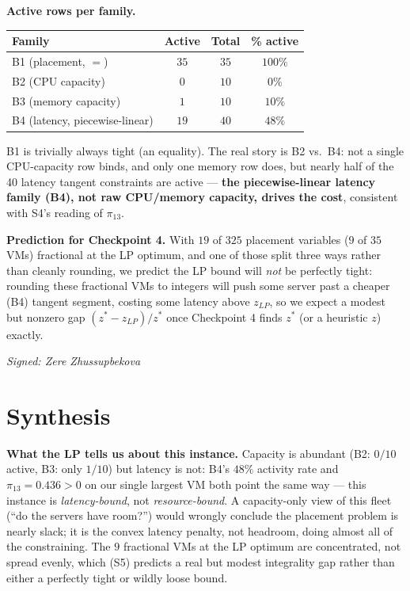 \documentclass[11pt]{article}
\begin{document}
\textbf{Active rows per family.}
\begin{center}
\renewcommand{\arraystretch}{1.2}
\begin{tabular}{@{}lccc@{}}
\toprule
Family & Active & Total & \% active \\
\midrule
B1 (placement, $=$) & $35$ & $35$ & $100\%$ \\
B2 (CPU capacity) & $0$ & $10$ & $0\%$ \\
B3 (memory capacity) & $1$ & $10$ & $10\%$ \\
B4 (latency, piecewise-linear) & $19$ & $40$ & $48\%$ \\
\bottomrule
\end{tabular}
\end{center}
B1 is trivially always tight (an equality). The real story is B2 vs.\ B4: not a single CPU-capacity
row binds, and only one memory row does, but nearly half of the 40 latency tangent constraints are
active --- \textbf{the piecewise-linear latency family (B4), not raw CPU/memory capacity, drives
the cost}, consistent with S4's reading of $\pi_{13}$.

\textbf{Prediction for Checkpoint 4.} With $19$ of $325$ placement variables ($9$ of $35$ VMs)
fractional at the LP optimum, and one of those split three ways rather than cleanly rounding, we
predict the LP bound will \emph{not} be perfectly tight: rounding these fractional VMs to integers
will push some server past a cheaper (B4) tangent segment, costing some latency above $z_{LP}$, so
we expect a modest but nonzero gap $(z^\ast-z_{LP})/z^\ast$ once Checkpoint 4 finds $z^\ast$ (or a
heuristic $z$) exactly.

\vspace{4pt}\noindent\textit{Signed: Zere Zhussupbekova}

\section{Synthesis}

\textbf{What the LP tells us about this instance.} Capacity is abundant (B2: $0/10$ active, B3:
only $1/10$) but latency is not: B4's $48\%$ activity rate and $\pi_{13}=0.436>0$ on our single
largest VM both point the same way --- this instance is \emph{latency-bound}, not
\emph{resource-bound}. A capacity-only view of this fleet (``do the servers have room?'') would
wrongly conclude the placement problem is nearly slack; it is the convex latency penalty, not
headroom, doing almost all of the constraining. The $9$ fractional VMs at the LP optimum are
concentrated, not spread evenly, which (S5) predicts a real but modest integrality gap rather than
either a perfectly tight or wildly loose bound.
\end{document}
